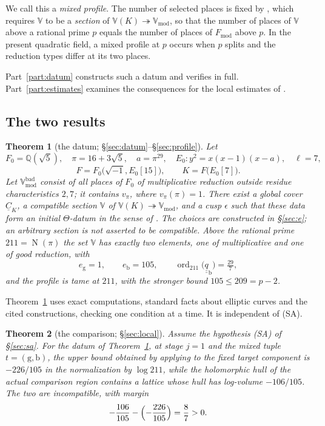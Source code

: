 \documentclass[11pt]{article}
\theoremstyle{plain}
\newtheorem{theorem}{Theorem}[section]
\theoremstyle{definition}
\newcommand{\Fmod}{F_{\mathrm{mod}}}
\newcommand{\Vmod}{\mathbb{V}_{\mathrm{mod}}}
\newcommand{\Vbad}{\mathbb{V}^{\mathrm{bad}}}
\newcommand{\VV}{\mathbb{V}}
\newcommand{\SA}{\textup{(SA)}}
\newcommand{\ord}{\operatorname{ord}}
\newcommand{\Norm}{\operatorname{N}}
\begin{document}
We call this a \emph{mixed profile}.  The number of selected places is fixed
by \cite[Definition 3.1(e)]{IUT1}, which requires $\VV$
to be a \emph{section} of $\VV(K)\twoheadrightarrow\Vmod$, so that the number of
places of $\VV$ above a rational prime $p$ equals the number of places of $\Fmod$
above $p$.  In the present quadratic field, a mixed profile at $p$ occurs when $p$ splits
and the reduction types differ at its two places.

Part~\ref{part:datum} constructs such a datum and verifies
\cite[Definition 3.1]{IUT1} in full.  Part~\ref{part:estimates} examines the
consequences for the local estimates of \cite[Theorem 1.10, proof, Step (v)]{IUT4}.

\subsection{The two results}\label{sec:results}

\begin{theorem}[the datum; \S\ref{sec:datum}--\S\ref{sec:profile}]\label{thm:A}
Let
\[
 F_0=\mathbb{Q}(\sqrt5),\quad \pi=16+3\sqrt5,\quad a=\pi^{29},\quad
 E_0:y^2=x(x-1)(x-a),\quad \ell=7,
\]
\[
 F=F_0\bigl(\sqrt{-1},E_0[15]\bigr),\qquad K=F\bigl(E_0[7]\bigr).
\]
Let $\Vbad_{\mathrm{mod}}$ consist of all places of $F_0$ of multiplicative
reduction outside residue characteristics $2,7$; it contains $v_\pi$, where
$v_\pi(\pi)=1$.  There exist a global cover $\underline C_K$, a compatible
section $\VV$ of $\VV(K)\twoheadrightarrow\Vmod$, and a cusp $\epsilon$ such that
these data form an initial $\Theta$-datum in the sense of
\cite[Definition 3.1]{IUT1}.  The choices are constructed in
\S\ref{sec:e}; an arbitrary section is not asserted to be compatible.  Above the rational prime $211=\Norm(\pi)$ the set
$\VV$ has exactly two elements, one of multiplicative and one of good reduction,
with
\[
 e_{\mathrm{g}}=1,\qquad e_{\mathrm{b}}=105,\qquad
 \ord_{211}\bigl(\underline{\underline q}_{\mathrm{b}}\bigr)=\tfrac{29}{7},
\]
and the profile is tame at $211$, with the stronger bound $105\le209=p-2$.
\end{theorem}

Theorem~\ref{thm:A} uses exact computations, standard facts about elliptic
curves and the cited constructions, checking \cite[Definition 3.1]{IUT1} one
condition at a time.  It is independent of \SA{}.

\begin{theorem}[the comparison; \S\ref{sec:local}]\label{thm:B}
Assume the hypothesis \SA{} of \S\ref{sec:sa}.  For the datum of
Theorem~\ref{thm:A}, at stage $j=1$ and the mixed tuple
$t=(\mathrm{g},\mathrm{b})$, the upper bound obtained by applying
\cite[Proposition 1.4(iii)]{IUT4} to the fixed target component is
$-226/105$ in the normalization by $\log211$, while the holomorphic hull of the actual comparison region contains
a lattice whose hull has log-volume $-106/105$.  The two are
incompatible, with margin
\[
 -\frac{106}{105}-\Bigl(-\frac{226}{105}\Bigr)=\frac{8}{7}>0 .
\]
\end{theorem}
\end{document}
